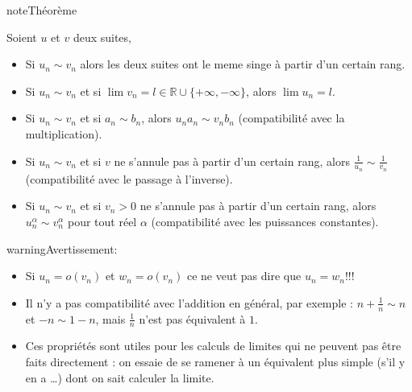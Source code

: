 \documentclass[letterpaper,10pt,french]{jupyterBook}
\begin{document}
\begin{sphinxadmonition}{note}{Théorème}

\sphinxAtStartPar
Soient \(u\) et \(v\) deux suites,
\begin{itemize}
\item {} 
\sphinxAtStartPar
Si \(u_n \sim v_n\) alors les deux suites ont le meme singe à partir d’un certain rang.

\item {} 
\sphinxAtStartPar
Si \(u_n \sim v_n\) et si \(\lim v_n = l \in \mathbb{R}\cup \{+\infty, -\infty\}\), alors \(\lim u_n = l\).

\item {} 
\sphinxAtStartPar
Si \(u_n \sim v_n\) et si \(a_n \sim b_n\), alors \(u_na_n \sim v_nb_n\) (compatibilité avec la multiplication).

\item {} 
\sphinxAtStartPar
Si \(u_n \sim v_n\) et si \(v\) ne s’annule pas à partir d’un certain rang, alors \(\frac{1}{u_n} \sim \frac{1}{v_n}\) (compatibilité avec le
passage à l’inverse).

\item {} 
\sphinxAtStartPar
Si \(u_n \sim v_n\) et si \(v_n > 0\) ne s’annule pas à partir d’un certain rang, alors \(u_n^\alpha \sim v_n^\alpha\) pour tout réel \(\alpha\)
(compatibilité avec les puissances constantes).

\end{itemize}
\end{sphinxadmonition}

\begin{sphinxadmonition}{warning}{Avertissement:}\begin{itemize}
\item {} 
\sphinxAtStartPar
Si \(u_n = o(v_n)\) et \(w_n = o(v_n)\) ce ne veut pas dire que \(u_n=w_n\)!!!

\item {} 
\sphinxAtStartPar
Il n’y a pas compatibilité avec l’addition en général, par exemple : \(n+\frac{1}{n} \sim n\) et \(−n \sim 1−n\), mais \(\frac{1}{n}\)
n’est pas équivalent à \(1\).

\item {} 
\sphinxAtStartPar
Ces propriétés sont utiles pour les calculs de limites qui ne peuvent pas être faits directement : on essaie de se
ramener à un équivalent plus simple (s’il y en a …) dont on sait calculer la limite.

\end{itemize}
\end{sphinxadmonition}
\end{document}
